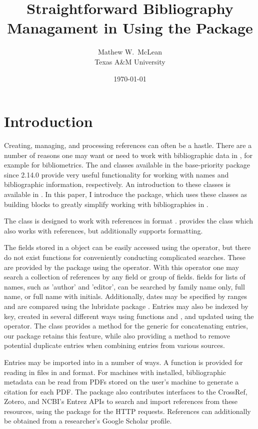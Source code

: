 \documentclass[article]{jss}\usepackage[]{graphicx}\usepackage[]{color}
\title{Straightforward Bibliography Managament in \R{} Using the \ourpkg{} Package}
\author{Mathew W.\ McLean\\ Texas A\&M University}
\date{\today}
\newcommand{\ourpkg}{\pkg{RefManageR}}
\newcommand{\bt}{\`{}}
\begin{document}
\maketitle
\section{Introduction}
Creating, managing, and processing references can often be a hastle.  There are a number of reasons one may want or need to work with bibliographic data in \R{}, for example for bibliometrics.  The  and  classes available in the base-priority  package since \R{} 2.14.0 provide very useful functionality for working with names and bibliographic information, respectively.  An introduction to these classes is available in \citet{hornik2012who}.  In this paper, I introduce the \ourpkg{} package, which uses these classes as building blocks to greatly simplify working with bibliographies in \R{}.

The  class is designed to work with references in \Bibtex{} format \citep{bibtex}.  \ourpkg{} provides the  class which also works with \Bibtex{} references, but additionally supports \Biblatex{} formatting.  

The \Bibtex{} fields stored in a  object can be easily accessed using the \code{\bt$\bt} operator, but there do not exist functions for conveniently conducting complicated searches.  These are provided by the \ourpkg{} package using the \code{\bt[\bt} operator.  With this operator one may search a collection of references by any field or group of fields.  \Biblatex{} fields for lists of names, such as 'author' and 'editor', can be searched by family name only, full name, or full name with initials.  Additionally, dates may be specified by ranges and are compared using the lubridate package \citep{lubridate}.  Entries may also be indexed by key, created in several different ways using functions  and , and updated using the \code{\bt[<-\bt} operator.  The  class provides a method for the  generic for concatenating entries, our package retains this feature, while also providing a  method to remove potential duplicate entries when combining entries from various sources.

Entries may be imported into \R{} in a number of ways.  A function is provided for reading in  files in \Biblatex{} and \Bibtex{} format.  For machines with  installed, bibliographic metadata can be read from PDFs stored on the user's machine to generate a citation for each PDF.  The package also contributes interfaces to the CrossRef, Zotero, and NCBI's Entrez APIs to search and import references from these resources, using the  package \citep{rcurl} for the HTTP requests.  References can additionally be obtained from a researcher's Google Scholar profile.
\end{document}
